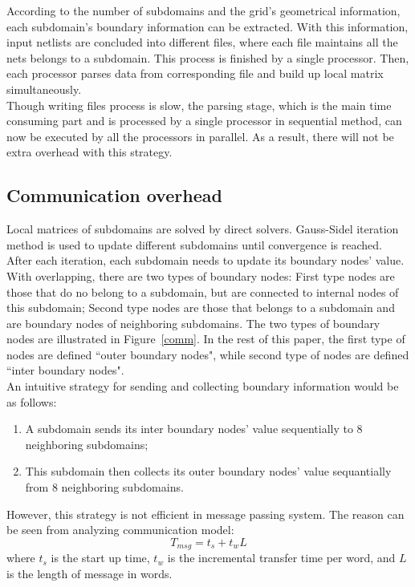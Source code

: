 \documentclass{sig-alternate}
\begin{document}
	According to the number of subdomains and the grid's geometrical information, each subdomain's boundary information can be 
	extracted. With this information, input netlists are concluded into different files, where each file maintains all the nets 
	belongs	to a subdomain. This process is finished by a single processor. Then, each processor parses data from 
	corresponding file and build up local matrix simultaneously.\\

	Though writing files process is slow, the parsing stage, which is the main time consuming part and is 
	processed by a single processor in sequential method, can now be executed by all the processors in parallel. As a result, 
	there will not be extra overhead with this strategy.\\
	 
     \subsection{Communication overhead}
	Local matrices of subdomains are solved by direct solvers. Gauss-Sidel iteration method is used
	to update different subdomains until convergence is reached. After each iteration, each subdomain needs to update its 
	boundary nodes' value. With overlapping, there are two types of boundary nodes: First type nodes are those that do no 
	belong to a subdomain, but are connected to internal nodes of 
	this subdomain; Second type nodes are those that belongs to a subdomain and are boundary nodes of neighboring subdomains. The 
	two types of boundary nodes are illustrated in Figure~\ref{comm}. In the rest of this paper, the first type of nodes are defined
	``outer boundary nodes", while second type of nodes are defined ``inter boundary nodes".\\ 

	An intuitive strategy for sending and collecting boundary information would be as follows:

	\begin{enumerate}[1.]
	  \item A subdomain sends its inter boundary nodes' value sequentially to 8 neighboring subdomains;
	  \item This subdomain then collects its outer boundary nodes' value sequantially from 8 neighboring subdomains.
	\end{enumerate}	

 	However, this strategy is not efficient in message passing system. The reason can be seen from analyzing
	communication model:
	\begin{equation}
		T_{msg} = t_s + t_wL\label{eq_msg}
	\end{equation}
	where $t_s$ is the start up time, $t_w$ is the incremental transfer time per word, and $L$ is the length of message in words.\\
	
\end{document}
